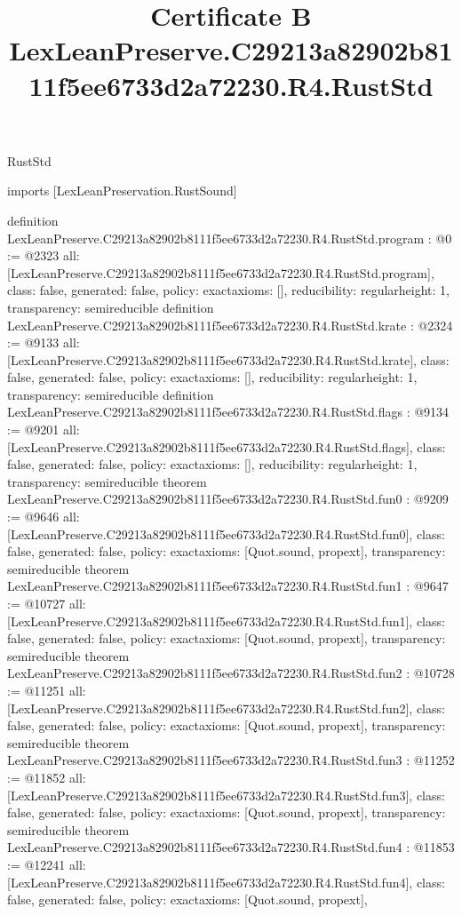 \begin{lexlean}{RustStd}
\title{Certificate B LexLeanPreserve.C29213a82902b8111f5ee6733d2a72230.R4.RustStd}
\begin{coremodule}
imports [LexLeanPreservation.RustSound]

definition LexLeanPreserve.C29213a82902b8111f5ee6733d2a72230.R4.RustStd.program : @0 := @2323 {
  all: [LexLeanPreserve.C29213a82902b8111f5ee6733d2a72230.R4.RustStd.program],
  class: false,
  generated: false,
  policy: exact{axioms: []},
  reducibility: regular{height: 1},
  transparency: semireducible
}
definition LexLeanPreserve.C29213a82902b8111f5ee6733d2a72230.R4.RustStd.krate : @2324 := @9133 {
  all: [LexLeanPreserve.C29213a82902b8111f5ee6733d2a72230.R4.RustStd.krate],
  class: false,
  generated: false,
  policy: exact{axioms: []},
  reducibility: regular{height: 1},
  transparency: semireducible
}
definition LexLeanPreserve.C29213a82902b8111f5ee6733d2a72230.R4.RustStd.flags : @9134 := @9201 {
  all: [LexLeanPreserve.C29213a82902b8111f5ee6733d2a72230.R4.RustStd.flags],
  class: false,
  generated: false,
  policy: exact{axioms: []},
  reducibility: regular{height: 1},
  transparency: semireducible
}
theorem LexLeanPreserve.C29213a82902b8111f5ee6733d2a72230.R4.RustStd.fun0 : @9209 := @9646 {
  all: [LexLeanPreserve.C29213a82902b8111f5ee6733d2a72230.R4.RustStd.fun0],
  class: false,
  generated: false,
  policy: exact{axioms: [Quot.sound, propext]},
  transparency: semireducible
}
theorem LexLeanPreserve.C29213a82902b8111f5ee6733d2a72230.R4.RustStd.fun1 : @9647 := @10727 {
  all: [LexLeanPreserve.C29213a82902b8111f5ee6733d2a72230.R4.RustStd.fun1],
  class: false,
  generated: false,
  policy: exact{axioms: [Quot.sound, propext]},
  transparency: semireducible
}
theorem LexLeanPreserve.C29213a82902b8111f5ee6733d2a72230.R4.RustStd.fun2 : @10728 := @11251 {
  all: [LexLeanPreserve.C29213a82902b8111f5ee6733d2a72230.R4.RustStd.fun2],
  class: false,
  generated: false,
  policy: exact{axioms: [Quot.sound, propext]},
  transparency: semireducible
}
theorem LexLeanPreserve.C29213a82902b8111f5ee6733d2a72230.R4.RustStd.fun3 : @11252 := @11852 {
  all: [LexLeanPreserve.C29213a82902b8111f5ee6733d2a72230.R4.RustStd.fun3],
  class: false,
  generated: false,
  policy: exact{axioms: [Quot.sound, propext]},
  transparency: semireducible
}
theorem LexLeanPreserve.C29213a82902b8111f5ee6733d2a72230.R4.RustStd.fun4 : @11853 := @12241 {
  all: [LexLeanPreserve.C29213a82902b8111f5ee6733d2a72230.R4.RustStd.fun4],
  class: false,
  generated: false,
  policy: exact{axioms: [Quot.sound, propext]},
}
\end{coremodule}
\end{lexlean}
